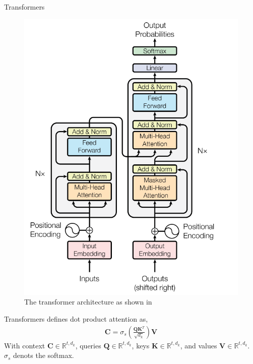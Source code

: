 \documentclass{beamer}
\begin{document}
    \begin{frame}{Transformers}
      \begin{figure}
        \includegraphics[width=.5\linewidth]{figures/transformer.png}
        \caption{The transformer architecture as shown in \cite{vaswani2017attention}}
      \end{figure}
    \end{frame}

    \begin{frame}{Transformers}
      \cite{vaswani2017attention} defines dot product attention as,
      \begin{align}
        \mathbf{C} = \sigma_s(\frac{\mathbf{Q}\mathbf{K}^T}{\sqrt{d_k}})\mathbf{V}
      \end{align}
      With context $\mathbf{C} \in \mathbb{R}^{t,d_k}$, queries $\mathbf{Q} \in \mathbb{R}^{t,d_k}$, keys $\mathbf{K} \in \mathbb{R}^{t,d_k}$,
      and values $ \mathbf{V} \in \mathbb{R}^{t,d_k}$. $ \sigma_s$ denots the softmax.
    \end{frame}
\end{document}
